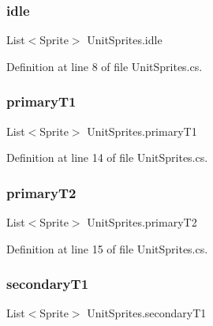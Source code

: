\mbox{\label{class_unit_sprites_a7dab10edddb2f02aac97a699ad4bd877}} 
\subsubsection{\texorpdfstring{idle}{idle}}
{\footnotesize\ttfamily List$<$Sprite$>$ Unit\+Sprites.\+idle}



Definition at line 8 of file Unit\+Sprites.\+cs.

\mbox{\label{class_unit_sprites_a628613428a3a72eacba6610e0b332a51}} 
\subsubsection{\texorpdfstring{primaryT1}{primaryT1}}
{\footnotesize\ttfamily List$<$Sprite$>$ Unit\+Sprites.\+primary\+T1}



Definition at line 14 of file Unit\+Sprites.\+cs.

\mbox{\label{class_unit_sprites_a2991644582def68ae1ab58e7f887acb8}} 
\subsubsection{\texorpdfstring{primaryT2}{primaryT2}}
{\footnotesize\ttfamily List$<$Sprite$>$ Unit\+Sprites.\+primary\+T2}



Definition at line 15 of file Unit\+Sprites.\+cs.

\mbox{\label{class_unit_sprites_ad5ba8963e97a5efd3bb56be95e573b1e}} 
\subsubsection{\texorpdfstring{secondaryT1}{secondaryT1}}
{\footnotesize\ttfamily List$<$Sprite$>$ Unit\+Sprites.\+secondary\+T1}



